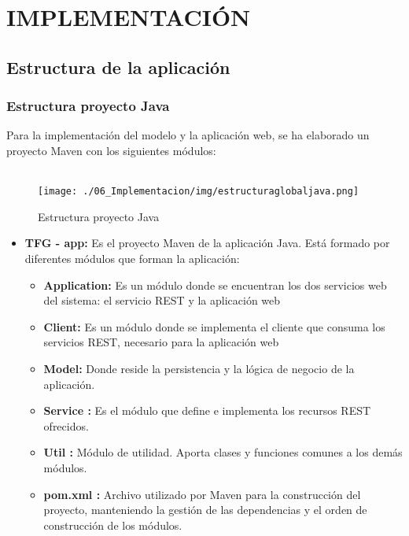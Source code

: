 \chapter[Implementación]{
  \label{chp:implementacion}
  IMPLEMENTACIÓN
}
\thispagestyle{numberingStyle}
\pagestyle{numberingStyle}



\section{Estructura de la aplicación}
\subsection{Estructura proyecto Java}
Para la implementación del modelo y la aplicación web, se ha elaborado un proyecto Maven con los siguientes módulos:
\\
\\

\begin{figure}[H]
\centering
\texttt{[image: ./06\_Implementacion/img/estructuraglobaljava.png]}
\caption{Estructura proyecto Java}
\end{figure}


\begin{itemize}
	\item \textbf{TFG - app: } Es el proyecto Maven de la aplicación Java. Está formado por diferentes módulos que forman la aplicación:
	\begin{itemize}
		\item \textbf{Application: } Es un módulo donde se encuentran los dos servicios web del sistema: el servicio REST y la aplicación web
		\item \textbf{Client: } Es un módulo donde se implementa el cliente que consuma los servicios REST, necesario para la aplicación web
		\item \textbf{Model: } Donde reside la persistencia y la lógica de negocio de la aplicación.
		\item \textbf{Service : } Es el módulo que define e implementa los recursos REST ofrecidos.
		\item \textbf{Util : } Módulo de utilidad. Aporta clases y funciones comunes a los demás módulos.
		\item \textbf{pom.xml : } Archivo utilizado por Maven para la construcción del proyecto, manteniendo la gestión de las dependencias y el orden de construcción de los módulos.
	\end{itemize}
\end{itemize}



